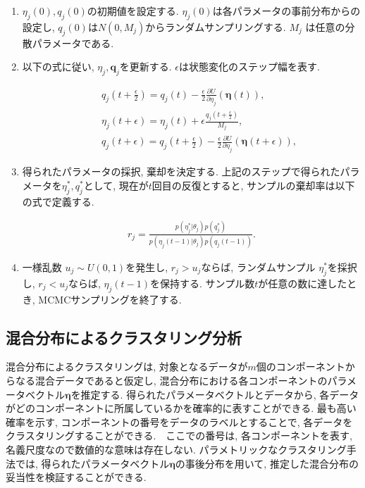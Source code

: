 \documentclass[a4j,12pt]{jarticle}
\begin{document}
\begin{enumerate}

\item{}
$\eta_j(0), q_j(0)$の初期値を設定する. $\eta_j(0)$は各パラメータの事前分布からの設定し, $q_j(0)$は$N(0,M_j)$からランダムサンプリングする. $M_j$ は任意の分散パラメータである. 
 
\item{}

以下の式に従い, $\eta_j, \bm q_j$を更新する. $\epsilon$は状態変化のステップ幅を表す.

\begin{eqnarray*}
&&q_j(t+\frac{\epsilon}{2}) = q_j(t) - \frac{\epsilon}{2} \frac{\partial U}{\partial \eta_j} (\bm \eta(t)), \\
&&\eta_j(t+\epsilon) = \eta_j(t) + \epsilon \frac{q_j(t + \frac{\epsilon}{2})}{M_j}, \\
&&q_j(t+\epsilon) = q_j(t+\frac{\epsilon}{2}) - \frac{\epsilon}{2} \frac{\partial U}{\partial \eta_j} (\bm \eta(t + \epsilon)),
\end{eqnarray*}

\item{}
得られたパラメータの採択, 棄却を決定する. 上記のステップで得られたパラメータを$\eta^*_j, q^*_j$として,
現在が$t$回目の反復とすると, サンプルの棄却率は以下の式で定義する.

\begin{eqnarray*}
r_j = \frac{p(\eta^*_j|\theta_j) p(q^*_j)}{p(\eta_j(t-1)|\theta_j) p(q_j(t-1))}.
\end{eqnarray*}

\item{}
一様乱数 $u_j \sim U(0,1)$を発生し, $r_j > u_j$ならば, ランダムサンプル $\eta^*_j$を採択し, $r_j < u_j$ならば, $\eta_j(t-1)$を保持する. サンプル数$t$が任意の数に達したとき, MCMCサンプリングを終了する. 

\end{enumerate}

\subsection{混合分布によるクラスタリング分析}

混合分布によるクラスタリングは, 対象となるデータが$m$個のコンポーネントからなる混合データであると仮定し, 混合分布における各コンポーネントのパラメータベクトル$\bm \eta$を推定する. 得られたパラメータベクトルとデータから, 各データがどのコンポーネントに所属しているかを確率的に表すことができる. 最も高い確率を示す, コンポーネントの番号をデータのラベルとすることで, 各データをクラスタリングすることができる.　ここでの番号は, 各コンポーネントを表す, 名義尺度なので数値的な意味は存在しない. パラメトリックなクラスタリング手法では, 得られたパラメータベクトル$\bm \eta$の事後分布を用いて, 推定した混合分布の妥当性を検証することができる.
\end{document}
